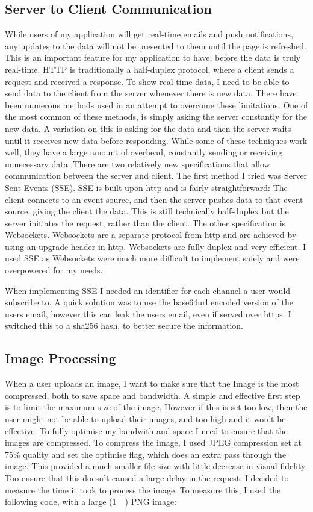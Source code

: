 \documentclass[a4paper,oneside,12pt,draft]{report}
\begin{document}
	\subsection{Server to Client Communication}
	While users of my application will get real-time emails and push notifications, any updates to the data will not be presented to them until the page is refreshed. This is an important feature for my application to have, before the data is truly real-time. HTTP is traditionally a half-duplex protocol, where a client sends a request and received a response. To show real time data, I need to be able to send data to the client from the server whenever there is new data. There have been numerous methods used in an attempt to overcome these limitations. One of the most common of these methods, is simply asking the server constantly for the new data. A variation on this is asking for the data and then the server waits until it receives new data before responding. While some of these techniques work well, they have a large amount of overhead, constantly sending or receiving unnecessary data. There are two relatively new specifications that allow communication between the server and client. The first method I tried was Server Sent Events (SSE). SSE is built upon http and is fairly straightforward: The client connects to an event source, and then the server pushes data to that event source, giving the client the data. This is still technically half-duplex but the server initiates the request, rather than the client. The other specification is Websockets. Websockets are a separate protocol from http and are achieved by using an upgrade header in http. Websockets are fully duplex and very efficient. I used SSE as Websockets were much more difficult to implement safely and were overpowered for my needs.

	When implementing SSE I needed an identifier for each channel a user would subscribe to. A quick solution was to use the base64url encoded version of the users email, however this can leak the users email, even if served over https. I switched this to a sha256 hash, to better secure the information.

	\subsection{Image Processing}
	When a user uploads an image, I want to make sure that the Image is the most compressed, both to save space and bandwidth.
	A simple and effective first step is to limit the maximum size of the image. However if this is set too low, then the user might not be able to upload their images, and too high and it won't be effective. To fully optimise my bandwith and space I need to ensure that the images are compressed. To compress the image, I used JPEG compression set at 75\% quality and set the optimise flag, which does an extra pass through the image. This provided a much smaller file size with little decrease in visual fidelity. Too ensure that this doesn't caused a large delay in the request, I decided to measure the time it took to process the image. To measure this, I used the following code, with a large (\SI{1}{\mega\byte}) PNG image:
\end{document}
